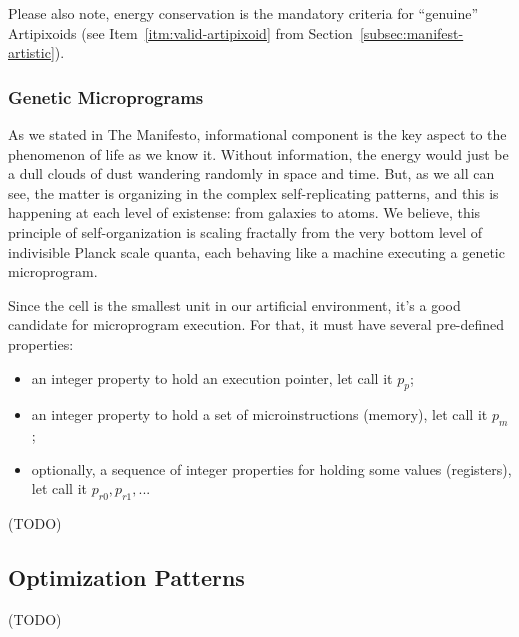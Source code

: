 \documentclass[a4paper,12pt,tikz,UTF8]{article}
\begin{document}
    Please also note, energy conservation is the mandatory criteria for ``genuine'' Artipixoids (see Item~\ref{itm:valid-artipixoid} from Section~\ref{subsec:manifest-artistic}).

  \subsubsection{Genetic Microprograms}

    As we stated in The Manifesto, informational component is the key aspect to the phenomenon of life as we know it. Without information, the energy would just be a dull clouds of dust wandering randomly in space and time. But, as we all can see, the matter is organizing in the complex self-replicating patterns, and this is happening at each level of existense: from galaxies to atoms. We believe, this principle of self-organization is scaling fractally from the very bottom level of indivisible Planck scale quanta, each behaving like a machine executing a genetic microprogram.

    Since the cell is the smallest unit in our artificial environment, it's a good candidate for microprogram execution. For that, it must have several pre-defined properties:
    \begin{itemize}
      \item an integer property to hold an execution pointer, let call it $p_p$;
      \item an integer property to hold a set of microinstructions (memory), let call it $p_m$;
      \item optionally, a sequence of integer properties for holding some values (registers), let call it $p_{r0}, p_{r1}, ...$ 
    \end{itemize}

    (TODO)

  \subsection{Optimization Patterns}

    (TODO)
\end{document}
